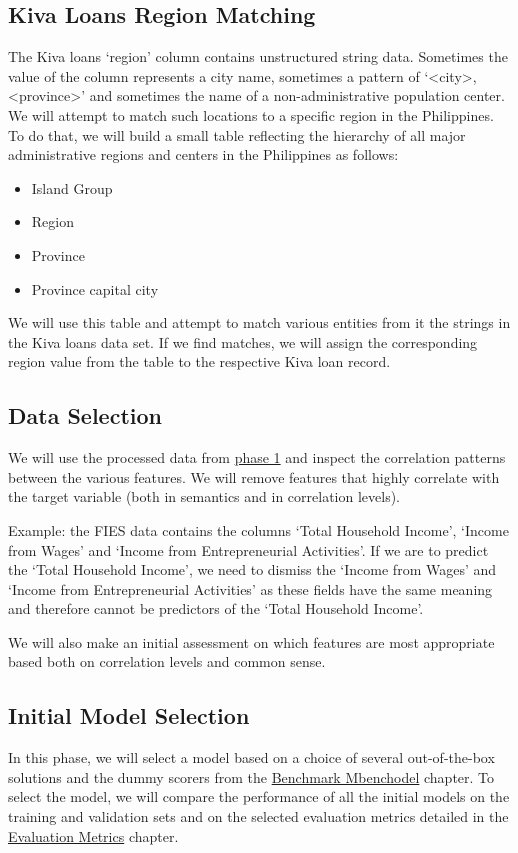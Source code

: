 \documentclass{article}
\begin{document}
\subsection{Kiva Loans Region Matching}
The Kiva loans ‘region’ column contains unstructured string data. Sometimes the value of the column represents a city name, sometimes a pattern of ‘<city>, <province>’ and sometimes the name of a non-administrative population center. We will attempt to match such locations to a specific region in the Philippines. To do that, we will build a small table reflecting the hierarchy of all major administrative regions and centers in the Philippines as follows:
\begin{itemize}
  \item Island Group
  \item Region
  \item Province
  \item Province capital city
\end{itemize}
We will use this table and attempt to match various entities from it the strings in the Kiva loans data set. If we find matches, we will assign the corresponding region value from the table to the respective Kiva loan record.
\subsection{Data Selection}
We will use the processed data from \hyperlink{phase1}{phase 1} and inspect the correlation patterns between the various features. We will remove features that highly correlate with the target variable (both in semantics and in correlation levels).

\begin{framed}
Example: the FIES data contains the columns ‘Total Household Income’, ‘Income from Wages’ and ‘Income from Entrepreneurial Activities’. If we are to predict the ‘Total Household Income’, we need to dismiss the ‘Income from Wages’ and ‘Income from Entrepreneurial Activities’ as these fields have the same meaning and therefore cannot be predictors of the ‘Total Household Income’.
\end{framed}

We will also make an initial assessment on which features are most appropriate based both on correlation levels and common sense.
\subsection{Initial Model Selection}
In this phase, we will select a model based on a choice of several out-of-the-box solutions and the dummy scorers from the \hyperlink{benchmark}{Benchmark Mbenchodel} chapter. To select the model, we will compare the performance of all the initial models on the training and validation sets and on the selected evaluation metrics detailed in the \hyperlink{metrics}{Evaluation Metrics} chapter.
\end{document}
